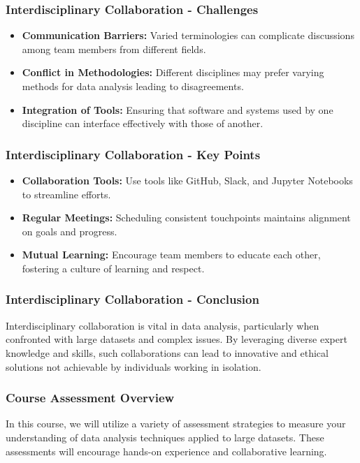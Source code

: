 \documentclass[aspectratio=169]{beamer}
\begin{document}
\begin{frame}[fragile]
    \frametitle{Interdisciplinary Collaboration - Challenges}
    \begin{itemize}
        \item \textbf{Communication Barriers:} Varied terminologies can complicate discussions among team members from different fields.
        \item \textbf{Conflict in Methodologies:} Different disciplines may prefer varying methods for data analysis leading to disagreements.
        \item \textbf{Integration of Tools:} Ensuring that software and systems used by one discipline can interface effectively with those of another.
    \end{itemize}
\end{frame}

\begin{frame}[fragile]
    \frametitle{Interdisciplinary Collaboration - Key Points}
    \begin{itemize}
        \item \textbf{Collaboration Tools:} Use tools like GitHub, Slack, and Jupyter Notebooks to streamline efforts.
        \item \textbf{Regular Meetings:} Scheduling consistent touchpoints maintains alignment on goals and progress.
        \item \textbf{Mutual Learning:} Encourage team members to educate each other, fostering a culture of learning and respect.
    \end{itemize}
\end{frame}

\begin{frame}[fragile]
    \frametitle{Interdisciplinary Collaboration - Conclusion}
    Interdisciplinary collaboration is vital in data analysis, particularly when confronted with large datasets and complex issues. By leveraging diverse expert knowledge and skills, such collaborations can lead to innovative and ethical solutions not achievable by individuals working in isolation.
\end{frame}

\begin{frame}[fragile]
    \frametitle{Course Assessment Overview}
    In this course, we will utilize a variety of assessment strategies to measure your understanding of data analysis techniques applied to large datasets. These assessments will encourage hands-on experience and collaborative learning.
\end{frame}
\end{document}
